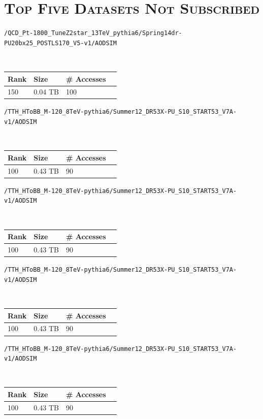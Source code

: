 \documentclass[11pt]{article}
\begin{document}
\section*{\textsc{Top Five Datasets Not Subscribed}}
	\begin{description}
		\item \begin{alltt}/QCD_Pt-1800_TuneZ2star_13TeV_pythia6/Spring14dr-PU20bx25_POSTLS170_V5-v1/AODSIM\end{alltt} \hfill \\
		\begin{tabular}{llll}
		Rank & Size & \# Accesses \\ \hline
		150 & 0.04 TB & 100 \\
		\end{tabular}

		\item \begin{alltt} /TTH_HToBB_M-120_8TeV-pythia6/Summer12_DR53X-PU_S10_START53_V7A-v1/AODSIM\end{alltt} \hfill \\
		\begin{tabular}{llll}
		Rank & Size & \# Accesses \\ \hline
		100 & 0.43 TB & 90 \\
		\end{tabular}

		\item \begin{alltt} /TTH_HToBB_M-120_8TeV-pythia6/Summer12_DR53X-PU_S10_START53_V7A-v1/AODSIM\end{alltt} \hfill \\
		\begin{tabular}{llll}
		Rank & Size & \# Accesses \\ \hline
		100 & 0.43 TB & 90 \\
		\end{tabular}

		\item \begin{alltt} /TTH_HToBB_M-120_8TeV-pythia6/Summer12_DR53X-PU_S10_START53_V7A-v1/AODSIM\end{alltt} \hfill \\
		\begin{tabular}{llll}
		Rank & Size & \# Accesses \\ \hline
		100 & 0.43 TB & 90 \\
		\end{tabular}

		\item \begin{alltt} /TTH_HToBB_M-120_8TeV-pythia6/Summer12_DR53X-PU_S10_START53_V7A-v1/AODSIM\end{alltt} \hfill \\
		\begin{tabular}{llll}
		Rank & Size & \# Accesses \\ \hline
		100 & 0.43 TB & 90 \\
		\end{tabular}
	\end{description}
\end{document}
